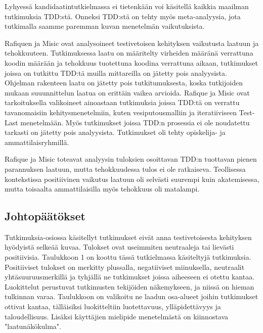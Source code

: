 \documentclass[finnish]{tktltiki2}
\theoremstyle{definition}
\theoremstyle{remark}
\begin{document}
Lyhyessä kandidaatintutkielmassa ei tietenkään voi käsitellä kaikkia maailman tutkimuksia TDD:stä. Onneksi TDD:stä on tehty myös meta-analyysia, jota tutkimalla saamme paremman kuvan menetelmän vaikutuksista.

Rafiquen ja Misic \cite{Rafique13} ovat analysoineet testivetoisen kehityksen vaikutusta laatuun ja tehokkuuteen. Tutkimuksessa laatu on määritelty virheiden määränä verrattuna koodin määrään ja tehokkuus tuotettuna koodina verrattuna aikaan, tutkimukset joissa on tutkittu TDD:tä muilla mittareilla on jätetty pois analyysista. Ohjelman rakenteen laatu on jätetty pois tutkitumuksesta, koska tutkijoiden mukaan suuunnittelun laatua on erittäin vaikea arvioida.  Rafique ja Misic ovat tarkoituksella valikoineet ainoastaan tutkimuksia joissa TDD:tä on verrattu tavanomaisiin kehitysmenetelmiin, kuten vesiputousmalliin ja iteratiiviseen Test-Last menetelmään. Myös tutkimukset joissa TDD:n prosessia ei ole noudatettu tarkasti on jätetty pois analyysista. Tutkimukset oli tehty opiskelija- ja ammattilaisryhmillä.

Rafique ja Misic toteavat analyysin tuloksien osoittavan TDD:n tuottavan pienen parannuksen laatuun, mutta tehokkuudessa tulos ei ole ratkaiseva. Teollisessa kontekstissa positiivinen vaikutus laatuun oli selvästi suurempi kuin akatemisessa, mutta toisaalta ammattilaisilla myös tehokkuus oli matalampi.





\subsection{Johtopäätökset}



Tutkimuksia-osiossa käsitellyt tutkimukset eivät anna testivetoisesta kehityksen hyödyistä selkeää kuvaa. Tulokset ovat useimmiten neutraaleja tai lievästi positiivisia.
  Taulukkoon 1 on koottu tässä tutkielmassa käsiteltyjä tutkimuksia. Positiiviset tulokset on merkitty plussalla, negatiiviset miinuksella, neutraalit yhtäsuuruusmerkillä ja tyhjällä ne tutkimukset joissa aiheeseen ei otettu kantaa. Luokittelut perustuvat tutkimusten tekijöiden näkemykseen, ja niissä on hieman tulkinnan varaa. Taulukkoon on valikoitu ne laadun osa-alueet joihin tutkimukset ottivat kantaa, tälläisiksi luokitteltiin luotettavuus, ylläpidettävyys ja taloudellisuus. Lisäksi käyttäjien mielipide menetelmästä on kiinnostava "laatunäkökulma".
\end{document}
